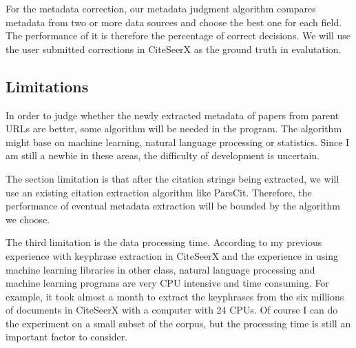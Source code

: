\documentclass[prodmode]{acmsmall} %
\begin{document}
For the metadata correction, our metadata judgment algorithm compares metadata from two or more data sources and choose the best one for each field. The performance of it is therefore the percentage of correct decisions. We will use the user submitted corrections in CiteSeerX as the ground truth in evalutation.

\subsection{Limitations}

In order to judge whether the newly extracted metadata of papers from parent URLs are better, some algorithm will be needed in the program. The algorithm might base on machine learning, natural language processing or statistics. Since I am still a newbie in these areas, the difficulty of development is uncertain.

The section limitation is that after the citation strings being extracted, we will use an existing citation extraction algorithm like ParsCit. Therefore, the performance of eventual metadata extraction will be bounded by the algorithm we choose.

The third limitation is the data processing time. According to my previous experience with keyphrase extraction in CiteSeerX and the experience in using machine learning libraries in other class, natural language processing and machine learning programs are very CPU intensive and time consuming. For example, it took almost a month to extract the keyphrases from the six millions of documents in CiteSeerX with a computer with 24 CPUs. Of course I can do the experiment on a small subset of the corpus, but the processing time is still an important factor to consider.



\end{document}
